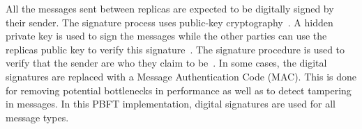 All the messages sent between replicas are expected to be digitally signed by their sender. The signature process uses public-key cryptography~\cite[p.~257,p.267]{BOOK:BuildDepDistSyst}. A hidden private key is used to sign the messages while the other parties can use the replicas public key to verify this signature~\cite[p.~417]{PAPER:PBFTRecovery}. The signature procedure is used to verify that the sender are who they claim to be~\cite[p.~3]{PAPER:OGPBFT}. In some cases, the digital signatures are replaced with a Message Authentication Code (MAC). This is done for removing potential bottlenecks in performance as well as to detect tampering in messages\cites[p.~257]{BOOK:BuildDepDistSyst}[p.~3,8]{PAPER:OGPBFT}. In this PBFT implementation, digital signatures are used for all message types.


